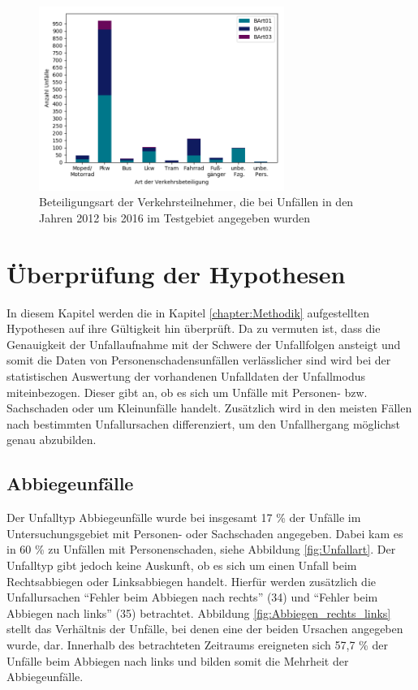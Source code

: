 \begin{savenotes}
	\begin{figure}[H]
		\centering
		\includegraphics[width=8cm,height=6cm]{figures/BArt}
		\caption[Beteiligungsart der Verkehrsteilnehmer, die bei Unfällen in den Jahren 2012 bis 2016 im Testgebiet angegeben wurden]{Beteiligungsart der Verkehrsteilnehmer, die bei Unfällen in den Jahren 2012 bis 2016 im Testgebiet angegeben wurden}\label{fig:Beteiligungsart}
	\end{figure}
\end{savenotes}

\section{Überprüfung der Hypothesen}\label{sechtion:Überprüfung der Thesen}
In diesem Kapitel werden die in Kapitel \ref{chapter:Methodik} aufgestellten Hypothesen auf ihre Gültigkeit hin überprüft. Da zu vermuten ist, dass die Genauigkeit der Unfallaufnahme mit der Schwere der Unfallfolgen ansteigt und somit die Daten von Personenschadensunfällen verlässlicher sind \parencite[S. 11]{StatistischesBundesamt.2018b} wird bei der statistischen Auswertung der vorhandenen Unfalldaten der Unfallmodus miteinbezogen. Dieser gibt an, ob es sich um Unfälle mit Personen- bzw. Sachschaden oder um Kleinunfälle handelt. Zusätzlich wird in den meisten Fällen nach bestimmten Unfallursachen differenziert, um den Unfallhergang möglichst genau abzubilden. %

\subsection{Abbiegeunfälle}
Der Unfalltyp Abbiegeunfälle wurde bei insgesamt 17 \% der Unfälle im Untersuchungsgebiet mit Personen- oder Sachschaden angegeben. Dabei kam es in 60 \% zu Unfällen mit Personenschaden, siehe Abbildung \ref{fig:Unfallart}. Der Unfalltyp gibt jedoch keine Auskunft, ob es sich um einen Unfall beim Rechtsabbiegen oder Linksabbiegen handelt. Hierfür werden zusätzlich die Unfallursachen \enquote{Fehler beim Abbiegen nach rechts} (34) und \enquote{Fehler beim Abbiegen nach links} (35) betrachtet. Abbildung \ref{fig:Abbiegen_rechts_links} stellt das Verhältnis der Unfälle, bei denen eine der beiden Ursachen angegeben wurde, dar. Innerhalb des betrachteten Zeitraums ereigneten sich 57,7 \% der Unfälle beim Abbiegen nach links und bilden somit die Mehrheit der Abbiegeunfälle.

